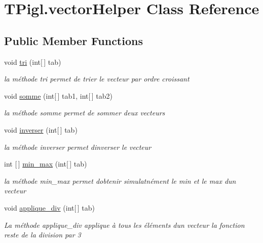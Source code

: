 \hypertarget{class_t_pigl_1_1vector_helper}{}\section{T\+Pigl.\+vector\+Helper Class Reference}
\label{class_t_pigl_1_1vector_helper}
\subsection*{Public Member Functions}
\begin{DoxyCompactItemize}
\item 
void \hyperlink{class_t_pigl_1_1vector_helper_a9447a1390b9a09ade0d252d8c21a901a}{tri} (int\mbox{[}$\,$\mbox{]} tab)
\begin{DoxyCompactList}\small\item\em la méthode tri permet de trier le vecteur par ordre croissant \end{DoxyCompactList}\item 
void \hyperlink{class_t_pigl_1_1vector_helper_aef84f14c086e1aae4f9446309ba0a1b8}{somme} (int\mbox{[}$\,$\mbox{]} tab1, int\mbox{[}$\,$\mbox{]} tab2)
\begin{DoxyCompactList}\small\item\em la méthode somme permet de sommer deux vecteurs \end{DoxyCompactList}\item 
void \hyperlink{class_t_pigl_1_1vector_helper_a90f5b534a7762117ce843ce79be2fced}{inverser} (int\mbox{[}$\,$\mbox{]} tab)
\begin{DoxyCompactList}\small\item\em la méthode inverser permet d\textquotesingle{}inverser le vecteur \end{DoxyCompactList}\item 
int \mbox{[}$\,$\mbox{]} \hyperlink{class_t_pigl_1_1vector_helper_a615ac23a44fc7c65f2637daba225bfef}{min\+\_\+max} (int\mbox{[}$\,$\mbox{]} tab)
\begin{DoxyCompactList}\small\item\em la méthode min\+\_\+max permet d\textquotesingle{}obtenir simulatnément le min et le max d\textquotesingle{}un vecteur \end{DoxyCompactList}\item 
void \hyperlink{class_t_pigl_1_1vector_helper_af3e69c4ec5721ea9236aad4ddb2995cb}{applique\+\_\+div} (int\mbox{[}$\,$\mbox{]} tab)
\begin{DoxyCompactList}\small\item\em La méthode applique\+\_\+div applique à tous les éléments d\textquotesingle{}un vecteur la fonction reste de la division par 3 \end{DoxyCompactList}\end{DoxyCompactItemize}


